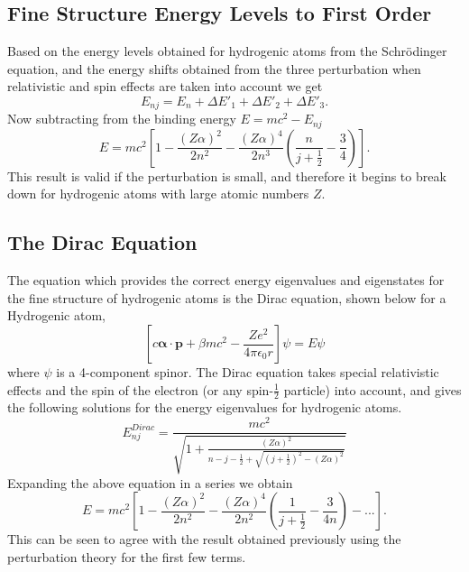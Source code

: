 \documentclass[a4paper]{serif}
\begin{document}
    \subsection{Fine Structure Energy Levels to First Order}
    Based on the energy levels obtained for hydrogenic atoms from the Schr\"odinger equation,
    and the energy shifts obtained from the three perturbation when relativistic and
    spin effects are taken into account we get
    \begin{displaymath}
        E_{nj} = E_n + \Delta E'_1 + \Delta E'_2 + \Delta E'_3.
    \end{displaymath}
    Now subtracting from the binding energy $E = mc^2 - E_{nj}$ 
    \begin{displaymath}
        E = mc^2 \left[ 1 - \frac{(Z \alpha)^2}{2n^2} - \frac{(Z \alpha)^4}{2n^3} 
                        \left(
                            \frac{n}{j + \frac{1}{2}} - \frac{3}{4}
                        \right)
                    \right] .
    \end{displaymath}
    This result is valid if the perturbation is small, and therefore it begins to break down
    for hydrogenic atoms with large atomic numbers $Z$.

    \subsection{The Dirac Equation}
    The equation which provides the correct energy eigenvalues and eigenstates for
    the fine structure of hydrogenic atoms is the Dirac equation, shown below for a
    Hydrogenic atom,
    \begin{displaymath}
        \left[ c \mathbf{\alpha} \cdot \mathbf{p} + 
               \beta m c^2 - \frac{Ze^2}{4 \pi \epsilon_0 r}
        \right] \psi = E \psi
    \end{displaymath}
    where $\psi$ is a 4-component spinor.
    The Dirac equation takes special relativistic effects and the spin of the electron
    (or any spin-$\frac{1}{2}$ particle) into account, and gives the following solutions for the energy
    eigenvalues for hydrogenic atoms.
    \begin{displaymath}
        E_{nj}^{Dirac} = \frac{mc^2}
        {
            \sqrt
            { 
                1 + \frac{(Z \alpha)^2}
                {
                    n - j - \frac{1}{2} +
                    \sqrt
                    {
                        \left(j + \frac{1}{2}\right)^2 - (Z \alpha)^2
                    }
                }
            }
        }
    \end{displaymath}
    Expanding the above equation in a series we obtain
    \begin{displaymath}
        E = mc^2 \left[ 
            1 - \frac{(Z\alpha)^2}{2n^2} - \frac{(Z\alpha)^4}{2n^2}
                    \left(
                        \frac{1}{j + \frac{1}{2}} - \frac{3}{4n}
                    \right)
                        - ...
                 \right]. 
    \end{displaymath}
    This can be seen to agree with the result obtained previously using the perturbation
    theory for the first few terms.
\end{document}
